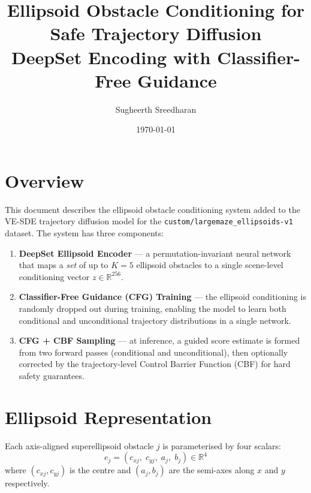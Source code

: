\documentclass{article}
\title{Ellipsoid Obstacle Conditioning for Safe Trajectory Diffusion\\
\large DeepSet Encoding with Classifier-Free Guidance}
\author{Sugheerth Sreedharan}
\date{\today}
\newcommand{\R}{\mathbb{R}}
\begin{document}
\maketitle
\tableofcontents
\newpage

\section{Overview}

This document describes the ellipsoid obstacle conditioning system added to the
VE-SDE trajectory diffusion model for the \texttt{custom/largemaze\_ellipsoids-v1}
dataset. The system has three components:

\begin{enumerate}
    \item \textbf{DeepSet Ellipsoid Encoder} — a permutation-invariant neural network
          that maps a \emph{set} of up to $K=5$ ellipsoid obstacles to a single
          scene-level conditioning vector $z \in \R^{256}$.

    \item \textbf{Classifier-Free Guidance (CFG) Training} — the ellipsoid conditioning
          is randomly dropped out during training, enabling the model to learn both
          conditional and unconditional trajectory distributions in a single network.

    \item \textbf{CFG + CBF Sampling} — at inference, a guided score estimate is formed
          from two forward passes (conditional and unconditional), then optionally
          corrected by the trajectory-level Control Barrier Function (CBF) for
          hard safety guarantees.
\end{enumerate}

\section{Ellipsoid Representation}

Each axis-aligned superellipsoid obstacle $j$ is parameterised by four scalars:
\begin{equation}
    e_j = (c_{xj},\; c_{yj},\; a_j,\; b_j) \in \R^4
\end{equation}
where $(c_{xj}, c_{yj})$ is the centre and $(a_j, b_j)$ are the semi-axes along
$x$ and $y$ respectively.
\end{document}
